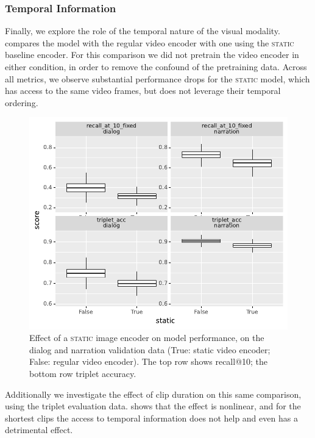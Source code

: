 \subsubsection{Temporal Information}
Finally, we explore the role of the temporal nature of the visual
modality.   compares the model with the regular video
encoder with one using the \textsc{static} baseline encoder.  For this
comparison we did not pretrain the video encoder in either condition,
in order to remove the confound of the pretraining data.  Across all
metrics, we observe substantial performance drops for the
\textsc{static} model, which has access to the same video frames, but
does not leverage their temporal ordering.
\begin{figure}[htb]
  \centering
  \includegraphics[width=\columnwidth]{results/ablations/static.pdf}
  \caption{Effect of a \textsc{static} image encoder on model
    performance, on the dialog and narration validation data (True:
    static video encoder; False: regular video encoder). The top row
    shows recall@10; the bottom row triplet accuracy.}
  \label{fig:static}
\end{figure}
Additionally we investigate the effect of clip duration on this same
comparison, using the triplet evaluation
data.  shows that the effect is nonlinear,
and for the shortest clips the access to temporal information does not
help and even has a detrimental effect.

